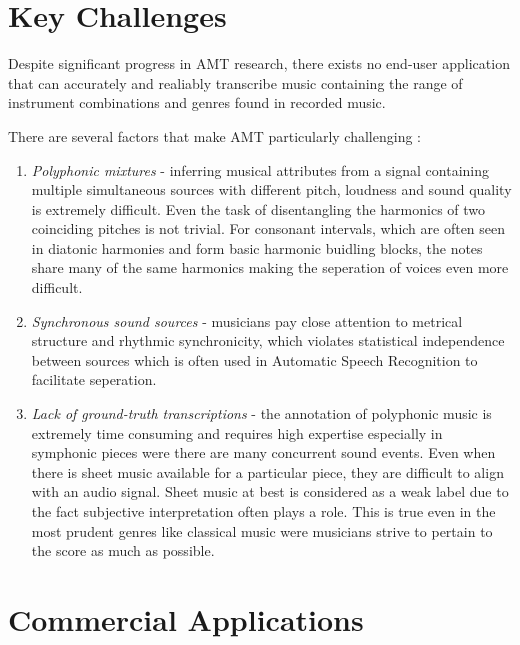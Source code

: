 \section{Key Challenges}

Despite significant progress in AMT research, there exists no end-user application that
can accurately and realiably transcribe music containing the range of instrument combinations and
genres found in recorded music.

There are several factors that make AMT particularly challenging :

\begin{enumerate}
      \item \emph{Polyphonic mixtures} - inferring musical attributes from a signal containing
            multiple simultaneous sources with different pitch, loudness and sound quality is extremely difficult. Even the
            task of disentangling the harmonics of two coinciding pitches is not trivial. For consonant intervals, which are often
            seen in diatonic harmonies and form basic harmonic buidling blocks, the notes share many of the same harmonics making the
            seperation of voices even more difficult. \cite{ISMIR-tut:Benetos}
      \item \emph{Synchronous sound sources} - musicians pay close attention to metrical structure and rhythmic synchronicity,
            which violates statistical independence between sources which is often used in Automatic Speech Recognition to facilitate seperation.
      \item \emph{Lack of ground-truth transcriptions} - the annotation of polyphonic music
            is extremely time consuming and requires high expertise especially in symphonic pieces were there
            are many concurrent sound events. Even when there is sheet music available for a particular piece, they
            are difficult to align with an audio signal. Sheet music at best is considered as a weak label due to the fact
            subjective interpretation often plays a role. This is true even in the most prudent genres like classical music were musicians strive to pertain to the
            score as much as possible. \cite{ground-truths:Su}
\end{enumerate}

\section{Commercial Applications}

